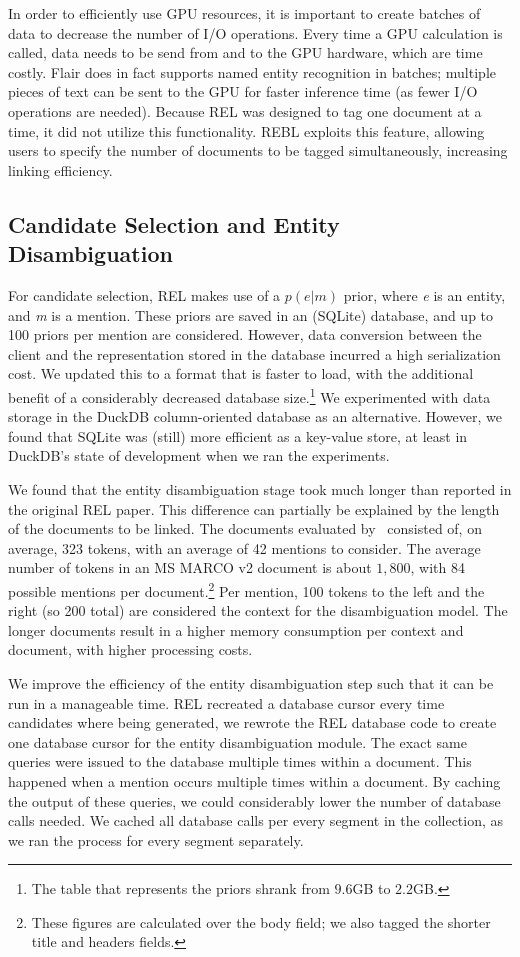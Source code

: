In order to efficiently use GPU resources, it is important to create batches of data to decrease the number of I/O operations. Every time a GPU calculation is called, data needs to be send from and to the GPU hardware, which are time costly. 
Flair does in fact supports named entity recognition in batches; multiple pieces of text can be sent to the GPU for faster inference time (as fewer I/O operations are needed). 
Because REL was designed to tag one document at a time, it did not utilize this functionality. REBL exploits this feature, allowing users to specify the number of documents to be tagged simultaneously, increasing linking efficiency. 

\subsection{Candidate Selection and Entity Disambiguation}
For candidate selection, REL makes use of a $p(e|m)$ prior, where \textit{e} is an entity, and \textit{m} is a mention. These priors are saved in an (SQLite) database, and up to 100 priors per mention are considered. However, data conversion between the client and the representation stored in the database incurred a high serialization cost. We updated this to a format that is faster to load, with the additional benefit of a considerably decreased database size.\footnote{The table that represents the priors shrank from $9.6$GB to $2.2$GB.}
We experimented with data storage in the DuckDB column-oriented database as an alternative. However, we found that SQLite was (still) more efficient as a key-value store, at least in DuckDB's state of development when we ran the experiments.

We found that the entity disambiguation stage took much longer than reported in the original REL paper. This difference can partially be explained by the length of the documents to be linked. The documents evaluated by~\citet{rel} consisted of, on average, 323 tokens, with an average of 42 mentions to consider. The average number of tokens in an MS MARCO v2 document is about $1,800$, with 84 possible mentions per document.\footnote{These figures are calculated over the body field; we also tagged the shorter title and headers fields.}
Per mention, 100 tokens to the left and the right (so 200 total) are considered the context for the disambiguation model. 
The longer documents result in a higher memory consumption per context and document, with higher processing costs.

We improve the efficiency of the entity disambiguation step such that it can be run in a manageable time. REL recreated a database cursor every time candidates where being generated, we rewrote the REL database code to create one database cursor for the entity disambiguation module. 
The exact same queries were issued to the database multiple times within a document. This happened when a mention occurs multiple times within a document. By caching the output of these queries, we could considerably lower the number of database calls needed. We cached all database calls per every segment in the collection, as we ran the process for every segment separately. 

